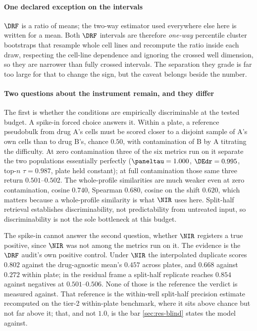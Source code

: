 \paragraph{One declared exception on the intervals} $\DRF$ is a ratio of means;
the two-way estimator used everywhere else here is written for a
mean. Both $\DRF$ intervals are therefore
\emph{one-way} percentile cluster bootstraps that resample whole cell lines and
recompute the ratio inside each draw, respecting the cell-line dependence and
ignoring the crossed well dimension, so they are narrower than fully crossed
intervals. The separation they grade is far too large for that to change the
sign, but the caveat belongs beside the number.

\paragraph{Two questions about the instrument remain, and they differ} The first
is whether the conditions are empirically discriminable at the tested budget. A
spike-in forced choice answers it. Within a plate, a reference pseudobulk from
drug A's cells must be scored closer to a disjoint sample of A's own cells than
to drug B's, chance $0.50$, with contamination of B by A titrating the
difficulty. At zero contamination three of the six metrics run on it
separate the two populations essentially perfectly ($\paneltau = 1.000$,
$\DEdr = 0.995$, top-$n$ $\tau = 0.987$, plate held constant); at full
contamination those same three return $0.501$--$0.502$. The whole-profile
similarities are much weaker even at zero contamination, cosine $0.740$,
Spearman $0.680$, cosine on the shift $0.620$, which matters because a
whole-profile similarity is what $\NIR$ uses here. Split-half retrieval
establishes discriminability, not predictability from untreated input, so
discriminability is not the sole bottleneck at this budget.

The spike-in cannot answer the second question, whether $\NIR$ registers a true
positive, since $\NIR$ was not among the metrics run on it. The evidence is the
$\DRF$ audit's own positive control. Under $\NIR$ the interpolated
duplicate scores $0.802$ against the drug-agnostic mean's $0.457$ across plates,
and $0.668$ against $0.272$ within plate; in the residual frame a split-half
replicate reaches $0.854$ against negatives at $0.501$--$0.506$. None of those is
the reference the verdict is measured against. That reference is the within-well
split-half precision estimate recomputed on the tier-2 within-plate benchmark,
where it sits above chance but not far above it; that, and not $1.0$, is the bar
\cref{sec:res-blind} states the model against.

